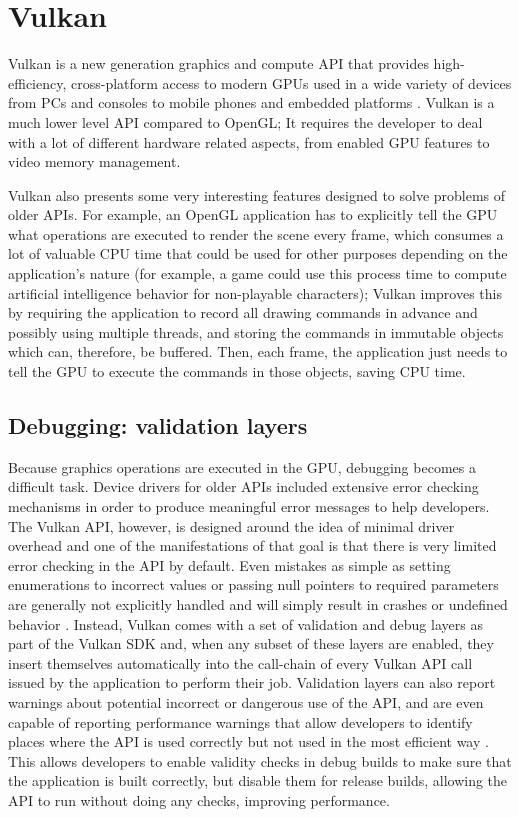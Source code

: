 \chapter{Vulkan}
Vulkan is a new generation graphics and compute API that provides high-efficiency, cross-platform access to modern GPUs used in a wide variety of devices from PCs and consoles to mobile phones and embedded platforms \cite{vulkan}. Vulkan is a much lower level API compared to OpenGL; It requires the developer to deal with a lot of different hardware related aspects, from enabled GPU features to video memory management.

Vulkan also presents some very interesting features designed to solve problems of older APIs. For example, an OpenGL application has to explicitly tell the GPU what operations are executed to render the scene every frame, which consumes a lot of valuable CPU time that could be used for other purposes depending on the application's nature (for example, a game could use this process time to compute artificial intelligence behavior for non-playable characters); Vulkan improves this by requiring the application to record all drawing commands in advance and possibly using multiple threads, and storing the commands in immutable objects which can, therefore, be buffered. Then, each frame, the application just needs to tell the GPU to execute the commands in those objects, saving CPU time.

\section{Debugging: validation layers}
Because graphics operations are executed in the GPU, debugging becomes a difficult task. Device drivers for older APIs included extensive error checking mechanisms in order to produce meaningful error messages to help developers. The Vulkan API, however, is designed around the idea of minimal driver overhead and one of the manifestations of that goal is that there is very limited error checking in the API by default. Even mistakes as simple as setting enumerations to incorrect values or passing null pointers to required parameters are generally not explicitly handled and will simply result in crashes or undefined behavior \cite{vulkan_tutorial}. Instead, Vulkan comes with a set of validation and debug layers as part of the Vulkan SDK and, when any subset of these layers are enabled, they insert themselves automatically into the call-chain of every Vulkan API call issued by the application to perform their job. Validation layers can also report warnings about potential incorrect or dangerous use of the API, and are even capable of reporting performance warnings that allow developers to identify places where the API is used correctly but not used in the most efficient way \cite{vulkan_validation_layers}. This allows developers to enable validity checks in debug builds to make sure that the application is built correctly, but disable them for release builds, allowing the API to run without doing any checks, improving performance.

